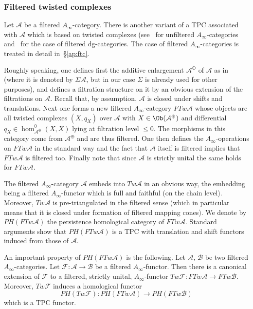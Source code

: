 \subsubsection{Filtered twisted complexes} \label{sbsb:ftw} Let
$\mathcal{A}$ be a filtered $A_{\infty}$-category. There is another
variant of a TPC associated with $\mathcal{A}$ which is based on
twisted complexes (see~\cite[Chapter~I,
Section~3(l)]{Se:book-fukaya-categ} for unfiltered
$A_{\infty}$-categories and~\cite[Section~2.5]{BCZ:tpc} for the case
of filtered dg-categories. The case of filtered
$A_{\infty}$-categories is treated in detail in~\S\ref{ap:ftc}.

Roughly speaking, one defines first the additive enlargement
$\mathcal{A}^{\oplus}$ of $\mathcal{A}$ as
in~\cite{Se:book-fukaya-categ} (where it is denoted by
$\Sigma \mathcal{A}$, but in our case $\Sigma$ is already used for
other purposes), and defines a filtration structure on it by an
obvious extension of the filtrations on $\mathcal{A}$. Recall that, by
assumption, $\mathcal{A}$ is closed under shifts and translations.
Next one forms a new filtered $A_{\infty}$-category $F Tw \mathcal{A}$
whose objects are all twisted complexes $(X, q_X)$ over $\mathcal{A}$
with $X \in \Ob(\mathcal{A}^{\oplus})$ and differential
$q_X \in \hom^{0}_{\mathcal{A}^{\oplus}}(X,X)$ lying at filtration
level $\leq 0$. The morphisms in this category come from
$\mathcal{A}^{\oplus}$ and are thus filtered. One then defines the
$A_{\infty}$-operations on $FTw \mathcal{A}$ in the standard way and
the fact that $\mathcal{A}$ itself is filtered implies that
$FTw \mathcal{A}$ is filtered too. Finally note that since
$\mathcal{A}$ is strictly unital the same holds for
$F Tw \mathcal{A}$.

The filtered $A_{\infty}$-category $\mathcal{A}$ embeds into
$Tw \mathcal{A}$ in an obvious way, the embedding being a filtered
$A_{\infty}$-functor which is full and faithful (on the chain
level). Moreover, $Tw \mathcal{A}$ is pre-triangulated in the filtered
sense (which in particular means that it is closed under formation of
filtered mapping cones). We denote by $PH(F Tw \mathcal{A})$ the
persistence homological category of $F Tw \mathcal{A}$. Standard
arguments show that $PH(F Tw \mathcal{A})$ is a TPC with translation
and shift functors induced from those of $\mathcal{A}$.

An important property of $PH(F Tw \mathcal{A})$ is the following.  Let
$\mathcal{A}$, $\mathcal{B}$ be two filtered
$A_{\infty}$-categories. Let
$\mathcal{F}: \mathcal{A} \longrightarrow \mathcal{B}$ be a filtered
$A_{\infty}$-functor. Then there is a canonical extension of
$\mathcal{F}$ to a filtered, strictly unital, $A_{\infty}$-functor
$Tw \mathcal{F}: FTw \mathcal{A} \longrightarrow FTw \mathcal{B}$.
Moreover, $Tw \mathcal{F}$ induces a homological functor
$$PH(Tw \mathcal{F}): PH(F Tw \mathcal{A}) \longrightarrow PH(FTw
\mathcal{B})$$ which is a TPC functor. 